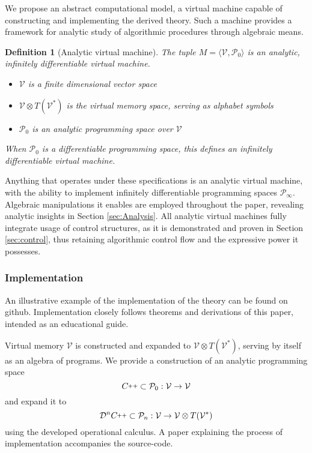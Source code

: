 \documentclass{article}
\newcommand{\VV}{\mathcal{V}}
\newcommand{\CC}{C\nolinebreak\hspace{-.05em}\raisebox{.4ex}{\tiny\bf +}\nolinebreak\hspace{-.10em}\raisebox{.4ex}{\tiny\bf +}}
\def\CC{{C\nolinebreak[4]\hspace{-.05em}\raisebox{.4ex}{\tiny\bf ++}}}
\newcommand{\dP}{\mathcal{P}}
\newcommand{\DD}{\mathcal{D}}
\newtheorem{definicija}{Definition}[section]
\begin{document}
We propose an abstract computational model, a virtual machine capable of constructing and implementing the derived theory. Such a machine provides a framework for analytic study of algorithmic procedures through algebraic means.

\begin{definicija}[Analytic virtual machine]
The tuple $M=\langle \VV,\dP_0\rangle$ is an analytic, infinitely  differentiable virtual machine.
   
    \begin{itemize}
    \item
    $\VV$ is a finite dimensional vector space
    \item
    $\VV\otimes T(\VV^*)$ is the virtual memory space, serving as alphabet symbols
    \item
    $\dP_0$ is an analytic programming space over $\VV$
    \end{itemize}
    When $\dP_0$ is a differentiable programming space, this defines an
    infinitely differentiable virtual machine.
  \end{definicija}
Anything that operates under these specifications is an analytic virtual machine, with the ability to implement infinitely differentiable programming spaces $\dP_\infty$. Algebraic manipulations it enables are employed throughout the paper, revealing analytic insights in Section \ref{sec:Analysis}.  All analytic virtual machines fully integrate usage of control structures, as it is demonstrated and proven in Section \ref{sec:control}, thus retaining algorithmic control flow and the expressive power it possesses. 

\subsubsection{Implementation}

An illustrative example of the implementation of the theory can be found on github. Implementation closely follows theorems and derivations of this paper, intended as an educational guide.

Virtual memory $\VV$ is constructed and expanded to $\VV\otimes T(\VV^*)$, serving by itself as an algebra of programs. We provide a construction of an analytic programming space
\begin{equation}
\CC\subset \dP_0:\VV\to\VV
\end{equation}
and expand it to
\begin{equation}
\DD^n\CC\subset\dP_n:\VV\to\VV\otimes T(\VV^*)
\end{equation}
using the developed operational calculus. A paper explaining the process of implementation accompanies the source-code. 
\end{document}
